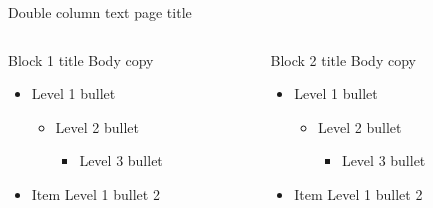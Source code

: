 \documentclass[t]{beamer}
\begin{document}
\begin{frame}{Double column text page title}
	\begin{columns}[T,totalwidth=\textwidth]
  		\begin{column}{0.45\textwidth}
  			\begin{block}{Block 1 title}
    				Body copy
    				\begin{itemize}    
    					\item Level 1 bullet
  					\begin{itemize}
  						\item Level 2 bullet
  						\begin{itemize}
  							\item Level 3 bullet
  						\end{itemize}
  					\end{itemize}
    					\item Item Level 1 bullet 2
    				\end{itemize}  
			\end{block}
  		\end{column} %
  		\begin{column}{0.45\textwidth}
  			\begin{block}{Block 2 title}
    				Body copy
    				\begin{itemize}    
    					\item Level 1 bullet
  					\begin{itemize}
  						\item Level 2 bullet
  						\begin{itemize}
  							\item Level 3 bullet
  						\end{itemize}
  					\end{itemize}
    					\item Item Level 1 bullet 2
    				\end{itemize}  
			\end{block}
  		\end{column}%
	\end{columns}
\end{frame}
\end{document}
